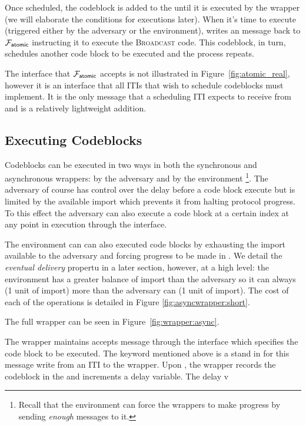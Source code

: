 Once scheduled, the codeblock is added to the  until it is executed by the wrapper (we will elaborate the conditions for executions later).
When it's time to execute (triggered either by the adversary or the environment), \Wasync writes an \Exec message back to $\mathcal{F}_{{\mathsf {atomic}}}$ instructing it to execute the \textsc{Broadcast} code.
This codeblock, in turn, schedules another code block to be executed and the process repeats.

The \Exec interface that $\mathcal{F}_{{\mathsf {atomic}}}$ accepts is not illustrated in Figure~\ref{fig:atomic_real}, however it is an interface that all ITIs that wish to schedule codeblocks must implement.
It is the only message that a scheduling ITI expects to receive from \Wasync and is a relatively lightweight addition. 

\subsection{Executing Codeblocks}
Codeblocks can be executed in two ways in both the synchronous and asynchronous wrappers: by the adversary and by the environment \footnote{Recall that the environment can force the wrappers to make progress by sending {\em enough} \Advance messages to it.}.
The adversary of course has control over the delay before a code block execute but is limited by the available import which prevents it from halting protocol progress.
To this effect the adversary can also execute a code block at a certain index at any point in execution through the \Exec interface.

The environment can can also executed code blocks by exhausting the import available to the adversary and forcing progress to be made in \Wasync.
We detail the {\em eventual delivery} propertu in a later section, however, at a high level: the environment has a greater balance of import than the adversary so it can always \Advance (1 unit of import) more than the adversary can \Delay (1 unit of import).
The cost of each of the operations is detailed in Figure \ref{fig:asyncwrapper:short}.




The full wrapper can be seen in Figure~\ref{fig:wrapper:async}.

The wrapper maintains accepts message through the  interface which specifies the code block to be executed.
The \Eventually keyword mentioned above is a stand in for this message write from an ITI to the wrapper.
Upon , the wrapper records the codeblock in the  and increments a delay variable.
The delay v


